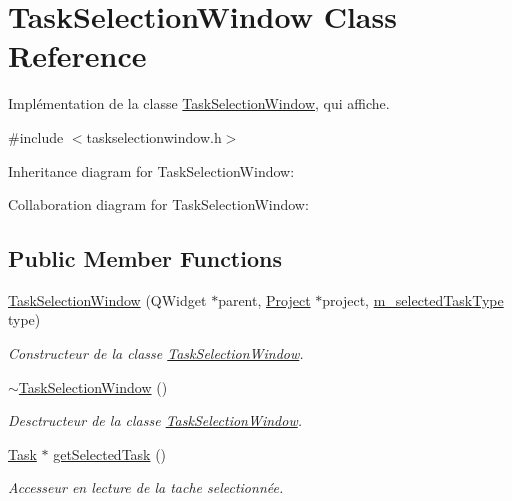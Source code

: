 \hypertarget{class_task_selection_window}{}\section{Task\+Selection\+Window Class Reference}
\label{class_task_selection_window}


Implémentation de la classe \hyperlink{class_task_selection_window}{Task\+Selection\+Window}, qui affiche.  




{\ttfamily \#include $<$taskselectionwindow.\+h$>$}



Inheritance diagram for Task\+Selection\+Window\+:


Collaboration diagram for Task\+Selection\+Window\+:
\subsection*{Public Member Functions}
\begin{DoxyCompactItemize}
\item 
\hyperlink{class_task_selection_window_a1ee5666499806d03df9dd3598dc85683}{Task\+Selection\+Window} (Q\+Widget $\ast$parent, \hyperlink{class_project}{Project} $\ast$project, \hyperlink{taskselectionwindow_8h_ab4314f91e8a8cb508912f3efcb967396}{m\+\_\+selected\+Task\+Type} type)
\begin{DoxyCompactList}\small\item\em Constructeur de la classe \hyperlink{class_task_selection_window}{Task\+Selection\+Window}. \end{DoxyCompactList}\item 
\hyperlink{class_task_selection_window_a34a091b56e0a3ea961d06460765cca4e}{$\sim$\+Task\+Selection\+Window} ()
\begin{DoxyCompactList}\small\item\em Desctructeur de la classe \hyperlink{class_task_selection_window}{Task\+Selection\+Window}. \end{DoxyCompactList}\item 
\hyperlink{class_task}{Task} $\ast$ \hyperlink{class_task_selection_window_a395443048f8918e840e69c6321d62a68}{get\+Selected\+Task} ()
\begin{DoxyCompactList}\small\item\em Accesseur en lecture de la tache selectionnée. \end{DoxyCompactList}\end{DoxyCompactItemize}


